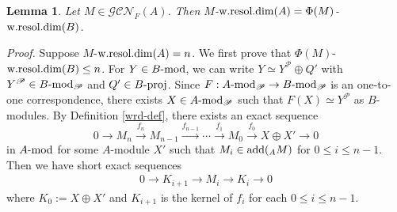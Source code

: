 \documentclass[12pt]{article}
\numberwithin{equation}{section}
\newtheorem{Lem}[Def]{Lemma}
\theoremstyle{definition}
\newcommand{\add}{{\rm add}}
\def\wrd{\mathop{\rm w.resol.dim}\nolimits}
\newcommand{\modcat}{\ensuremath{\mbox{{\rm -mod}}}}
\newcommand{\pmodcat}[1]{#1\mbox{{\rm -proj}}}
\newcommand{\lra}{\longrightarrow}
\newcommand{\lraf}[1]{\stackrel{#1}{\lra}}
\newcommand{\ra}{\rightarrow}
\begin{document}
\begin{Lem}\label{mwrd}
Let $M\in \mathcal{GCN}_{F}(A)$. Then $M$-$\wrd(A)=\Phi(M)$-$\wrd(B)$.
\end{Lem}
{\it Proof.} Suppose $M$-$\wrd(A)=n$. We first prove that $\Phi(M)$-$\wrd(B)\le n$. For $Y\in B\modcat$, we can write $Y\simeq Y^{\mathscr{P}}\oplus Q'$ with $Y^{\mathscr{P}}\in B\modcat_{\mathscr{P}}$ and $Q'\in \pmodcat{B}$. Since $F: A\modcat_{\mathscr{P}}\ra B\modcat_{\mathscr{P}}$ is an one-to-one correspondence, there exists $X\in A\modcat_{\mathscr{P}}$ such that $F(X)\simeq Y^{\mathscr{P}}$ as $B$-modules. By Definition \ref{wrd-def}, there exists an exact sequence
$$0\lra M_n\lraf{f_n} M_{n-1} \lraf{f_{n-1}} \cdots \lraf{f_1} M_0 \lraf{f_0} X\oplus X'\lra 0$$
in $A\modcat$ for some $A$-module $X'$ such that $M_i\in\add(_AM)$ for $0\le i\le n-1$. Then we have short exact sequences
\begin{align}\label{kmk}
0\lra K_{i+1}\lra M_i\lra K_i\lra 0
\end{align}
where $K_0:=X\oplus X'$ and $K_{i+1}$ is the kernel of $f_i$ for each $0\le i\le n-1$.
\end{document}
